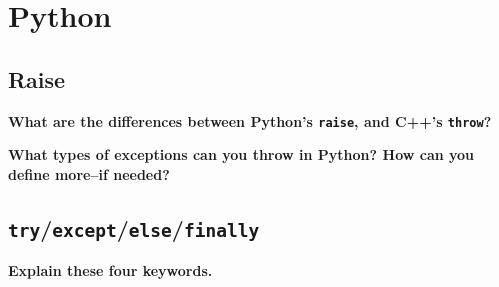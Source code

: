 \documentclass[12pt, letterpaper]{article}
\newcommand{\question}[2][4em]{\textbf{#2}\vspace{#1}\par}
\begin{document}
\pagebreak
\section{Python}

\subsection{Raise}

\question{What are the differences between Python's \texttt{raise}, and C++'s
\newline\texttt{throw}?}

\question{What types of exceptions can you throw in Python? How can you define
more--if needed?}

\subsection{\texttt{try}/\texttt{except}/\texttt{else}/\texttt{finally}}

\question{Explain these four keywords.}
\end{document}
